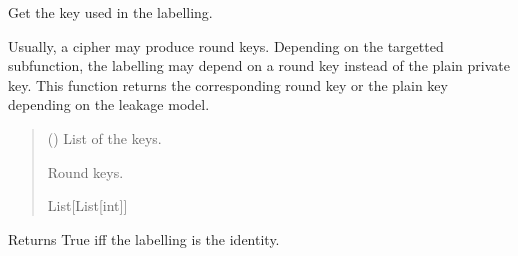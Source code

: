 \documentclass[letterpaper,10pt,english]{sphinxmanual}
\begin{document}
\begin{fulllineitems}
\begin{fulllineitems}
\end{fulllineitems}


\begin{fulllineitems}
\label{\detokenize{MLSCAlib.Ciphers:MLSCAlib.Ciphers.leakage_model.LeakageModel.get_used_keys}}
\pysigstartsignatures
{}
\pysigstopsignatures
\sphinxAtStartPar
Get the key used in the labelling.

\sphinxAtStartPar
Usually, a cipher may produce round keys. Depending on the targetted
sub\sphinxhyphen{}function, the labelling may depend on a round key instead of the
plain private key. This function returns the corresponding round key
or the plain key depending on the leakage model.
\begin{quote}\begin{description}
\sphinxAtStartPar
{} (\sphinxstyleliteralemphasis{\sphinxupquote{{[}}}\sphinxstyleliteralemphasis{\sphinxupquote{{[}}}\sphinxstyleliteralemphasis{\sphinxupquote{{]}}}\sphinxstyleliteralemphasis{\sphinxupquote{{]}}}) \textendash{} List of the keys.

\sphinxAtStartPar
{} \textendash{} Round keys.

\sphinxAtStartPar
List{[}List{[}int{]}{]}

\end{description}\end{quote}

\end{fulllineitems}


\begin{fulllineitems}
\label{\detokenize{MLSCAlib.Ciphers:MLSCAlib.Ciphers.leakage_model.LeakageModel.is_ID}}
\pysigstartsignatures
{}
\pysigstopsignatures
\sphinxAtStartPar
Returns True iff the labelling is the identity.


\end{fulllineitems}
\end{fulllineitems}
\end{document}
